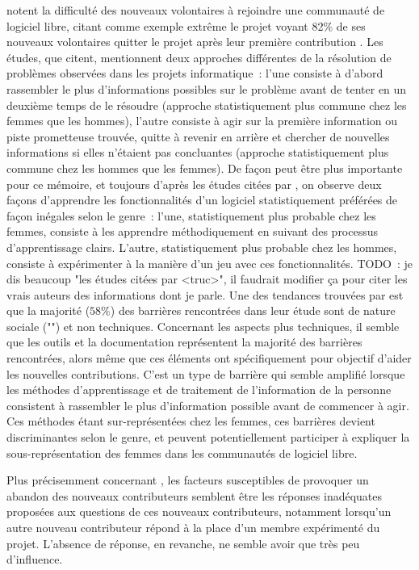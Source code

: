  notent la difficulté des nouveaux volontaires à rejoindre une communauté de
logiciel libre, citant comme exemple extrême le projet  voyant 82\% de ses nouveaux
volontaires quitter le projet après leur première contribution . Les
études, que \textcite[p.~1005]{barriers-2018} citent, mentionnent deux approches différentes de la résolution
de problèmes observées dans les projets informatique : l'une consiste à d'abord rassembler le plus
d'informations possibles sur le problème avant de tenter en un deuxième temps de le résoudre (approche
statistiquement plus commune chez les femmes que les hommes), l'autre consiste à agir sur la première
information ou piste prometteuse trouvée, quitte à revenir en arrière et chercher de nouvelles informations si
elles n'étaient pas concluantes (approche statistiquement plus commune chez les hommes que les femmes). De
façon peut être plus importante pour ce mémoire, et toujours d'après les études citées par
\textcite[p.~1005]{barriers-2018}, on observe deux façons d'apprendre les fonctionnalités d'un logiciel
statistiquement préférées de façon inégales selon le genre : l'une, statistiquement plus probable chez les
femmes, consiste à les apprendre méthodiquement en suivant des processus d'apprentissage clairs. L'autre,
statistiquement plus probable chez les hommes, consiste à expérimenter à la manière d'un jeu avec ces
fonctionnalités. TODO : je dis beaucoup "les études citées par <truc>", il faudrait modifier ça pour citer les
vrais auteurs des informations dont je parle. Une des tendances trouvées par \textcite[p.~1008]{barriers-2018}
est que la majorité ($58\%$) des barrières rencontrées dans leur étude sont de nature sociale
("") et non techniques. Concernant les aspects plus techniques, il semble que les
outils et la documentation représentent la majorité des barrières rencontrées, alors même que ces éléments ont
spécifiquement pour objectif d'aider les nouvelles contributions. C'est un type de barrière qui semble
amplifié lorsque les méthodes d'apprentissage et de traitement de l'information de la personne consistent à
rassembler le plus d'information possible avant de commencer à agir. Ces méthodes étant sur-représentées chez
les femmes, ces barrières devient discriminantes selon le genre, et peuvent potentiellement participer à
expliquer la sous-représentation des femmes dans les communautés de logiciel libre.

Plus précisemment concernant , les facteurs susceptibles de provoquer un
abandon des nouveaux contributeurs semblent être les réponses inadéquates proposées aux questions de ces
nouveaux contributeurs, notamment lorsqu'un autre nouveau contributeur répond à la place d'un membre
expérimenté du projet. L'absence de réponse, en revanche, ne semble avoir que très peu d'influence.

